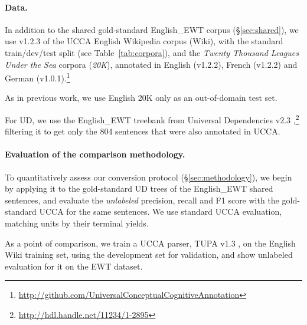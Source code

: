 \documentclass[11pt,a4paper]{article}
\begin{document}
\paragraph{Data.}

In addition to the shared gold-standard English\_EWT corpus (\S\ref{sec:shared}),
we use v1.2.3 of the UCCA English Wikipedia corpus (Wiki),
with the standard train/dev/test split (see Table~\ref{tab:corpora}),
and the \textit{Twenty Thousand Leagues Under the Sea} corpora (\textit{20K}),
annotated in English (v1.2.2), French (v1.2.2)
and German (v1.0.1).\footnote{\url{http://github.com/UniversalConceptualCognitiveAnnotation}}

As in previous work, we use English 20K only as an out-of-domain test set.


For UD, we use the English\_EWT treebank from Universal Dependencies v2.3
\cite{11234/1-2895},\footnote{\url{http://hdl.handle.net/11234/1-2895}}
filtering it to get only the 804 sentences that were also annotated in UCCA.



\paragraph{Evaluation of the comparison methodology.}

To quantitatively assess our conversion protocol (\S\ref{sec:methodology}),
we begin by applying it to
the gold-standard UD trees of the English\_EWT shared sentences,
and evaluate the \textit{unlabeled} precision, recall and F1 score
with the gold-standard UCCA for the same sentences.
We use standard UCCA evaluation, matching units by their terminal yields.

As a point of comparison, we train a UCCA parser,
TUPA v1.3 \cite{hershcovich2017a,hershcovich2018multitask},
on the English Wiki training set, using the development set for validation,
and show unlabeled evaluation for it on the EWT dataset.
\end{document}
